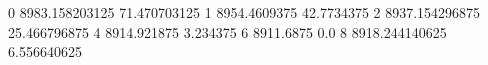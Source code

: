 0 8983.158203125 71.470703125
1 8954.4609375 42.7734375
2 8937.154296875 25.466796875
4 8914.921875 3.234375
6 8911.6875 0.0
8 8918.244140625 6.556640625
